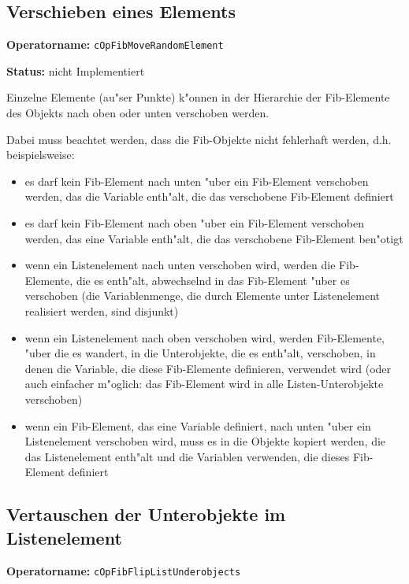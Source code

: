 \subsection{Verschieben eines Elements}

\textbf{Operatorname:} \verb|cOpFibMoveRandomElement|

\bigskip\noindent
\textbf{Status:} nicht Implementiert

\bigskip\noindent
Einzelne Elemente (au"ser Punkte) k"onnen in der Hierarchie der Fib-Elemente des Objekts nach oben oder unten verschoben werden.

\bigskip\noindent
Dabei muss beachtet werden, dass die Fib-Objekte nicht fehlerhaft werden, d.h. beispielsweise:
\begin{itemize}
  \item	es darf kein Fib-Element nach unten "uber ein Fib-Element verschoben werden, das die Variable enth"alt, die das verschobene Fib-Element definiert
  \item	es darf kein Fib-Element nach oben "uber ein Fib-Element verschoben werden, das eine Variable enth"alt, die das verschobene Fib-Element ben"otigt
  \item	wenn ein Listenelement nach unten verschoben wird, werden die Fib-Elemente, die es enth"alt, abwechselnd in das Fib-Element "uber es verschoben (die Variablenmenge, die durch Elemente unter Listenelement realisiert werden, sind disjunkt)
  \item	wenn ein Listenelement nach oben verschoben wird, werden Fib-Elemente, "uber die es wandert, in die Unterobjekte, die es enth"alt, verschoben, in denen die Variable, die diese Fib-Elemente definieren, verwendet wird (oder auch einfacher m"oglich: das Fib-Element wird in alle Listen-Unterobjekte verschoben)
  \item	wenn ein Fib-Element, das eine Variable definiert, nach unten "uber ein Listenelement verschoben wird, muss es in die Objekte kopiert werden, die das Listenelement enth"alt und die Variablen verwenden, die dieses Fib-Element definiert
\end{itemize}


\subsection{Vertauschen der Unterobjekte im Listenelement}

\textbf{Operatorname:} \verb|cOpFibFlipListUnderobjects|

